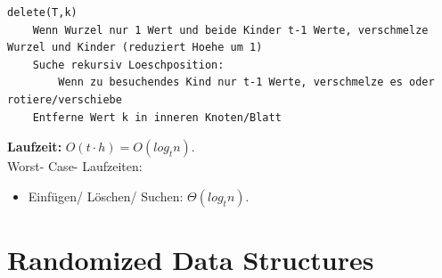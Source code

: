 \documentclass{article}
\begin{document}
            \newpage
            \begin{lstlisting}[style=pseudocode]
delete(T,k)
    Wenn Wurzel nur 1 Wert und beide Kinder t-1 Werte, verschmelze Wurzel und Kinder (reduziert Hoehe um 1)
    Suche rekursiv Loeschposition:
        Wenn zu besuchendes Kind nur t-1 Werte, verschmelze es oder rotiere/verschiebe
    Entferne Wert k in inneren Knoten/Blatt
            \end{lstlisting}
            \textbf{Laufzeit:} $O(t\cdot h) = O(log_t n)$.\\
            Worst- Case- Laufzeiten: 
            \begin{itemize}
                \item Einfügen/ Löschen/ Suchen: $\Theta(log_t n)$.
            \end{itemize}

    \newpage
    \section{Randomized Data Structures}
\end{document}
